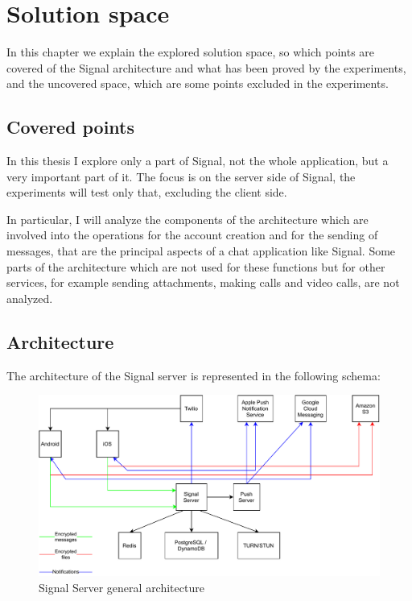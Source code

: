 \chapter{Solution space\label{sec:solutionspace}}

In this chapter we explain the explored solution space, so which points are covered of the Signal architecture and what has been proved by the experiments, and the uncovered space, which are some points excluded in the experiments.

\section{Covered points\label{sec:covered}}

In this thesis I explore only a part of Signal, not the whole application, but a very important part of it.
The focus is on the server side of Signal, the experiments will test only that, excluding the client side.

In particular, I will analyze the components of the architecture which are involved into the operations for the account creation and for the sending of messages, that are the principal aspects of a chat application like Signal.
Some parts of the architecture which are not used for these functions but for other services, for example sending attachments, making calls and video calls, are not analyzed.

\section{Architecture\label{sec:architecture}}

The architecture of the Signal server is represented in the following schema:

\begin{figure}[H]
    \centering
    \includegraphics[width=\textwidth]{images/Architecture}
    \caption{Signal Server general architecture}
    \label{fig:signalarchitecture}
\end{figure}

